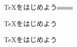 \documentclass[12pt]{jarticle}
\begin{document}
\begin{center}
\TeX をはじめようssssss
\end{center}
\begin{flushleft}
\TeX をはじめよう
\end{flushleft}
\begin{flushright}
\TeX をはじめよう
\end{flushright}
\end{document}
